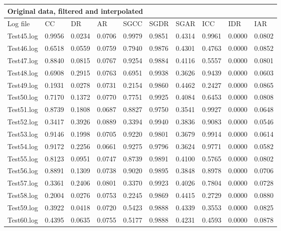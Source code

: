 \begin{table}[]
\begin{tabular}{|l|l|l|l|l|l|l|l|l|l|}
\hline
\multicolumn{10}{|l|}{Original data, filtered and interpolated} \\ \hline
Log file  &  CC & DR &  AR  & SGCC & SGDR & SGAR &  ICC & IDR & IAR \\ \hline
Test45.log & 0.9956 & 0.0234 & 0.0706 & 0.9979 & 0.9851 & 0.4314 & 0.9961 & 0.0000 & 0.0802 \\ \hline
Test46.log & 0.6518 & 0.0559 & 0.0759 & 0.7940 & 0.9876 & 0.4301 & 0.4763 & 0.0000 & 0.0852 \\ \hline
Test47.log & 0.8840 & 0.0815 & 0.0767 & 0.9254 & 0.9884 & 0.4116 & 0.5557 & 0.0000 & 0.0801 \\ \hline
Test48.log & 0.6908 & 0.2915 & 0.0763 & 0.6951 & 0.9938 & 0.3626 & 0.9439 & 0.0000 & 0.0603 \\ \hline
Test49.log & 0.1931 & 0.0278 & 0.0731 & 0.2154 & 0.9860 & 0.4462 & 0.2427 & 0.0000 & 0.0865 \\ \hline
Test50.log & 0.7170 & 0.1372 & 0.0770 & 0.7751 & 0.9925 & 0.4084 & 0.6453 & 0.0000 & 0.0808 \\ \hline
Test51.log & 0.8739 & 0.1808 & 0.0687 & 0.8827 & 0.9750 & 0.3541 & 0.9927 & 0.0000 & 0.0648 \\ \hline
Test52.log & 0.3417 & 0.3926 & 0.0889 & 0.3394 & 0.9940 & 0.3836 & 0.9083 & 0.0000 & 0.0546 \\ \hline
Test53.log & 0.9146 & 0.1998 & 0.0705 & 0.9220 & 0.9801 & 0.3679 & 0.9914 & 0.0000 & 0.0614 \\ \hline
Test54.log & 0.9172 & 0.2256 & 0.0661 & 0.9275 & 0.9796 & 0.3624 & 0.9771 & 0.0000 & 0.0582 \\ \hline
Test55.log & 0.8123 & 0.0951 & 0.0747 & 0.8739 & 0.9891 & 0.4100 & 0.5765 & 0.0000 & 0.0802 \\ \hline
Test56.log & 0.8891 & 0.1309 & 0.0738 & 0.9020 & 0.9895 & 0.3848 & 0.8978 & 0.0000 & 0.0706 \\ \hline
Test57.log & 0.3361 & 0.2406 & 0.0801 & 0.3370 & 0.9923 & 0.4026 & 0.7804 & 0.0000 & 0.0728 \\ \hline
Test58.log & 0.2004 & 0.0276 & 0.0753 & 0.2245 & 0.9869 & 0.4415 & 0.2729 & 0.0000 & 0.0880 \\ \hline
Test59.log & 0.3922 & 0.0418 & 0.0720 & 0.5423 & 0.9888 & 0.4339 & 0.3553 & 0.0000 & 0.0825 \\ \hline
Test60.log & 0.4395 & 0.0635 & 0.0755 & 0.5177 & 0.9888 & 0.4231 & 0.4593 & 0.0000 & 0.0878 \\ \hline

\end{tabular}
\end{table}
